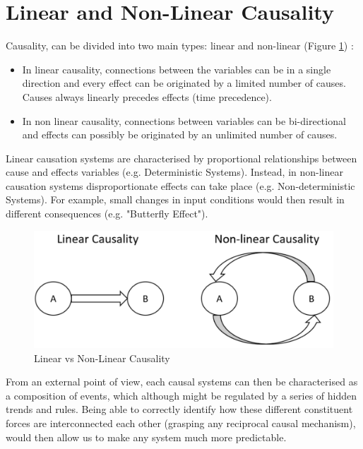 \section{Linear and Non-Linear Causality}
\vspace{-0.1cm}
Causality, can be divided into two main types: linear and non-linear (Figure \ref{wow}) \cite{system}: 
\vspace{-1.3cm}
\begin{itemize}
    \setlength\itemsep{-0.5em}
    \item In linear causality, connections between the variables can be in a single direction and every effect can be originated by a limited number of causes. Causes always linearly precedes effects (time precedence).
    \item In non linear causality, connections between variables can be bi-directional and effects can possibly be originated by an unlimited number of causes.
\end{itemize}
\vspace{-0.4cm}
Linear causation systems are characterised by proportional relationships between cause and effects variables (e.g. Deterministic Systems). Instead, in non-linear causation systems disproportionate effects can take place (e.g. Non-deterministic Systems). For example, small changes in input conditions would then result in different consequences (e.g. "Butterfly Effect").
\vspace{-0.1cm}
\begin{figure}[ht!]%
    \centering
    \includegraphics[width=0.7\linewidth]{latex/images/linear.pdf}
    \vspace{-0.2cm}
    \caption{Linear vs Non-Linear Causality}
    \label{wow}
\end{figure}
\vspace{-0.5cm}

From an external point of view, each causal systems can then be characterised as a composition of events, which although might be regulated by a series of hidden trends and rules. Being able to correctly identify how these different constituent forces are interconnected each other (grasping any reciprocal causal mechanism), would then allow us to make any system much more predictable. 

